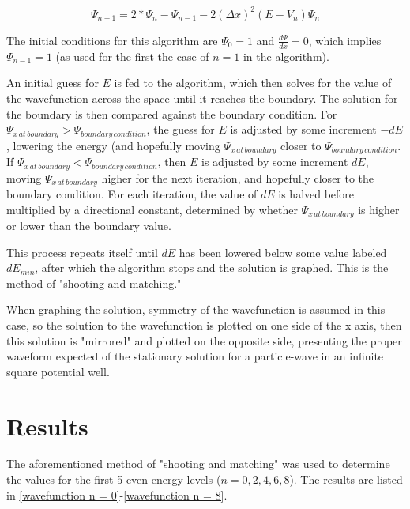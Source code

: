 \documentclass[12pt]{article}                  %
\begin{document}
\begin{equation}
\Psi_{n+1}= 2*\Psi_{n} - \Psi_{n-1} - 2(\Delta x)^2(E - V_{n})\Psi_{n}
\end{equation} 

The initial conditions for this algorithm are $\Psi_{0} = 1$ and $\frac{d\Psi}{dx} = 0$, which implies $\Psi_{n-1} = 1$ (as used for the first the case of $n = 1$ in the algorithm). 

An initial guess for $E$ is fed to the algorithm, which then solves for the value of the wavefunction across the space until it reaches the boundary. The solution for the boundary is then compared against the boundary condition. For $\Psi_{x\, at\, boundary} > \Psi_{boundary\, condition}$, the guess for $E$ is adjusted by some increment $-dE$, lowering the energy (and hopefully moving $\Psi_{x\, at\, boundary}$ closer to $\Psi_{boundary\, condition}$. If $\Psi_{x\, at\, boundary} < \Psi_{boundary\, condition}$, then $E$ is adjusted by some increment $dE$, moving $\Psi_{x\, at\, boundary}$ higher for the next iteration, and hopefully closer to the boundary condition. For each iteration, the value of $dE$ is halved before multiplied by a directional constant, determined by whether $\Psi_{x\, at\, boundary}$ is higher or lower than the boundary value. 

This process repeats itself until $dE$ has been lowered below some value labeled $dE_{min}$, after which the algorithm stops and the solution is graphed. This is the method of "shooting and matching."

When graphing the solution, symmetry of the wavefunction is assumed in this case, so the solution to the wavefunction is plotted on one side of the x axis, then this solution is "mirrored" and plotted on the opposite side, presenting the proper waveform expected of the stationary solution for a particle-wave in an infinite square potential well. 

\pagebreak

\section{Results}
The aforementioned method of "shooting and matching" was used to determine the values for the first 5 even energy levels ($n = 0, 2, 4, 6, 8$). The results are listed in \ref{wavefunction n = 0}-\ref{wavefunction n = 8}. 
\end{document}
